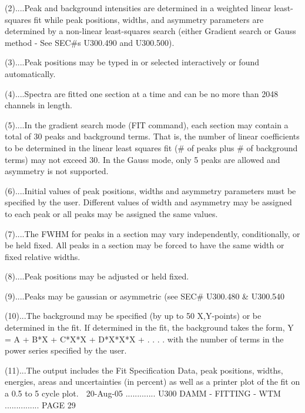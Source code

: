    (2)....Peak  and background intensities are determined in a weighted linear
          least-squares  fit  while  peak  positions,  widths,  and  asymmetry
          parameters  are  determined  by  a  non-linear  least-squares search
          (either Gradient search or Gauss method -  See  SEC#s  U300.490  and
          U300.500).
 
   (3)....Peak  positions  may  be typed in or selected interactively or found
          automatically.
 
   (4)....Spectra are fitted one section at a time and can  be  no  more  than
          2048 channels in length.
 
   (5)....In  the gradient search mode (FIT command), each section may contain
          a total of 30 peaks and background terms. That  is,  the  number  of
          linear  coefficients  to  be  determined in the linear least squares
          fit (# of peaks plus # of background terms) may not  exceed  30.  In
          the  Gauss  mode,  only  5  peaks  are  allowed and asymmetry is not
          supported.
 
   (6)....Initial values of peak positions, widths  and  asymmetry  parameters
          must  be  specified  by  the  user.  Different  values  of width and
          asymmetry may be assigned to each peak or all peaks may be  assigned
          the same values.
 
   (7)....The  FWHM  for  peaks  in  a   section   may   vary   independently,
          conditionally,  or  be  held  fixed.  All  peaks in a section may be
          forced to have the same width or fixed relative widths.
 
   (8)....Peak positions may be adjusted or held fixed.
 
   (9)....Peaks may be gaussian or asymmetric (see SEC# U300.480 & U300.540
 
   (10)...The background may be specified (by  up  to  50  X,Y-points)  or  be
          determined  in  the  fit.  If  determined in the fit, the background
          takes the form, Y = A + B*X + C*X*X + D*X*X*X + . .  .  .  with  the
          number of terms in the power series specified by the user.
 
   (11)...The  output  includes  the  Fit  Specification Data, peak positions,
          widths, energies, areas and uncertainties (in percent) as well as  a
          printer plot of the fit on a 0.5 to 5 cycle plot.
    
   20-Aug-05 ............. U300  DAMM - FITTING - WTM ............... PAGE  29
 
